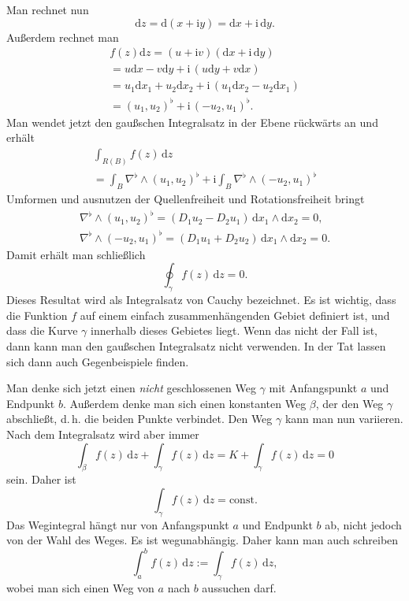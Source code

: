 \documentclass[a4paper,11pt,fleqn,twocolumn,twoside]{scrartcl}
\numberwithin{equation}{section}
\newcommand{\ui}{\mathrm i}
\begin{document}
Man rechnet nun
\begin{equation}
\mathrm dz = \mathrm d(x+\ui y) = \mathrm dx+\ui\,\mathrm dy.
\end{equation}
Außerdem rechnet man
\begin{gather*}
f(z)\mathrm dz = (u+\ui v)(\mathrm dx+\ui\,\mathrm dy)\\
= u\mathrm dx-v\mathrm dy+\ui\,(u\mathrm dy+v\mathrm dx)\\
= u_1\mathrm dx_1+u_2\mathrm dx_2+\ui\,(u_1\mathrm dx_2-u_2\mathrm dx_1)\\
= (u_1,u_2)^\flat + \ui\,(-u_2,u_1)^\flat.
\end{gather*}
Man wendet jetzt den gaußschen Integralsatz in der Ebene rückwärts an
und erhält
\begin{gather*}
\int_{R(B)} f(z)\,\mathrm dz\\
= \int_B \nabla^\flat\wedge (u_1,u_2)^\flat
+ \ui\int_B \nabla^\flat\wedge (-u_2,u_1)^\flat
\end{gather*}
Umformen und ausnutzen der Quellenfreiheit
und Rotationsfreiheit bringt
\begin{gather*}
\nabla^\flat\wedge (u_1,u_2)^\flat
= (D_1u_2-D_2u_1)\,\mathrm dx_1\wedge\mathrm dx_2= 0,\\
\nabla^\flat\wedge (-u_2,u_1)^\flat = (D_1u_1+D_2u_2)\,
\mathrm dx_1\wedge\mathrm dx_2 = 0.
\end{gather*}
Damit erhält man schließlich
\begin{equation}
\oint_\gamma f(z)\,\mathrm dz = 0.
\end{equation}
Dieses Resultat wird als Integralsatz von Cauchy bezeichnet.
Es ist wichtig, dass die Funktion $f$ auf einem einfach
zusammenhängenden Gebiet definiert ist, und dass die Kurve $\gamma$
innerhalb dieses Gebietes liegt. Wenn das nicht der Fall ist, dann
kann man den gaußschen Integralsatz nicht verwenden. In der Tat lassen
sich dann auch Gegenbeispiele finden.

Man denke sich jetzt einen \textit{nicht} geschlossenen Weg $\gamma$
mit Anfangspunkt $a$ und Endpunkt $b$. Außerdem denke man sich
einen konstanten Weg $\beta$, der den Weg $\gamma$
abschließt, d.\,h. die beiden Punkte verbindet. Den Weg $\gamma$
kann man nun variieren. Nach dem Integralsatz wird aber immer
\[\int_{\beta} f(z)\,\mathrm dz+\int_\gamma f(z)\,\mathrm dz
=K+\int_\gamma f(z)\,\mathrm dz=0\]
sein. Daher ist
\begin{equation}
\int_\gamma f(z)\,\mathrm dz=\mathrm{const}.
\end{equation}
Das Wegintegral hängt nur von Anfangspunkt $a$ und Endpunkt $b$
ab, nicht jedoch von der Wahl des Weges. Es ist wegunabhängig. Daher
kann man auch schreiben
\begin{equation}
\int_a^b f(z)\,\mathrm dz:=\int_\gamma f(z)\,\mathrm dz,
\end{equation}
wobei man sich einen Weg von $a$ nach $b$ aussuchen darf.
\end{document}
